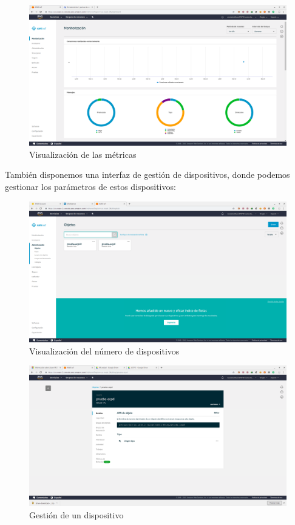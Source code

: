 \begin{figure}[h]
	\centering
	\includegraphics[scale=0.2]{iot_aws/centro.png}
	\caption{Visualización de las métricas}
	\label{AWSIOT6}
\end{figure}

\newpage
También disponemos una interfaz de gestión de dispositivos, donde podemos gestionar los parámetros de estos dispositivos:


\begin{figure}[h]
	\centering
	\includegraphics[scale=0.2]{iot_aws/dispositivos.png}
	\caption{Visualización del número de dispositivos}
	\label{AWSIOT7}
\end{figure}

\begin{figure}[h]
	\centering
	\includegraphics[scale=0.2]{iot_aws/dispositivos2.png}
	\caption{Gestión de un dispositivo}
	\label{AWSIOT8}
\end{figure}

